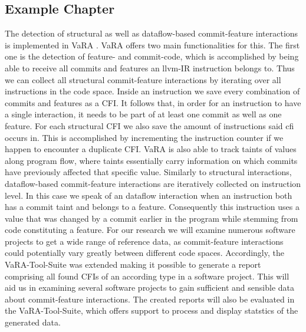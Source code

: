 \subsection*{Example Chapter}\label{sec:example_chapter}

The detection of structural as well as dataflow-based commit-feature interactions is implemented in VaRA \cite{VaRA2023}.
VaRA offers two main functionalities for this. 
The first one is the detection of feature- and commit-code, which is accomplished by being able to receive all commits and features an llvm-IR instruction belongs to.
Thus we can collect all structural commit-feature interactions by iterating over all instructions in the code space.
Inside an instruction we save every combination of commits and features as a CFI.
It follows that, in order for an instruction to have a single interaction, it needs to be part of at least one commit as well as one feature.
For each structural CFI we also save the amount of instructions said cfi occurs in. 
This is accomplished by incrementing the instruction counter if we happen to encounter a duplicate CFI. 
VaRA is also able to track taints of values along program flow, where taints essentially carry information on which commits have previously affected that specific value.
Similarly to structural interactions, dataflow-based commit-feature interactions are iteratively collected on instruction level.
In this case we speak of an dataflow interaction when an instruction both has a commit taint and belongs to a feature.
Consequently this instruction uses a value that was changed by a commit earlier in the program while stemming from code constituting a feature.
For our research we will examine numerous software projects to get a wide range of reference data, as commit-feature interactions could potentially vary greatly between different code spaces.
Accordingly, the VaRA-Tool-Suite was extended making it possible to generate a report comprising all found CFIs of an according type in a software project.
This will aid us in examining several software projects to gain sufficient and sensible data about commit-feature interactions.
The created reports will also be evaluated in the VaRA-Tool-Suite, which offers support to process and display statstics of the generated data. \\
